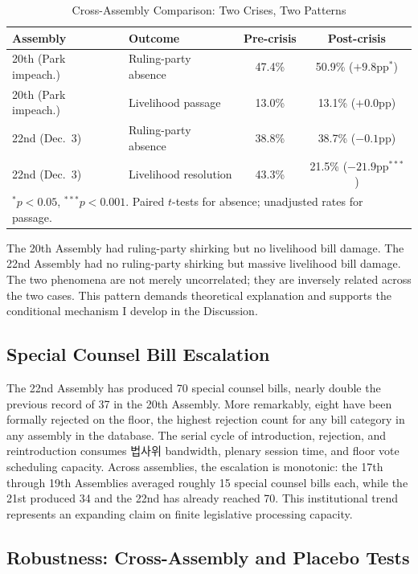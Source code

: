 \documentclass[11pt]{article}
\begin{document}
\begin{table}[htbp]
\centering
\caption{Cross-Assembly Comparison: Two Crises, Two Patterns}
\label{tab:cross}
\begin{tabular}{llcc}
\toprule
Assembly & Outcome & Pre-crisis & Post-crisis \\
\midrule
20th (Park impeach.) & Ruling-party absence & 47.4\% & 50.9\% ($+9.8$pp$^{*}$) \\
20th (Park impeach.) & Livelihood passage & 13.0\% & 13.1\% ($+0.0$pp) \\
\midrule
22nd (Dec.\ 3) & Ruling-party absence & 38.8\% & 38.7\% ($-0.1$pp) \\
22nd (Dec.\ 3) & Livelihood resolution & 43.3\% & 21.5\% ($-21.9$pp$^{***}$) \\
\bottomrule
\multicolumn{4}{l}{\footnotesize $^{*}p<0.05$, $^{***}p<0.001$. Paired $t$-tests for absence; unadjusted rates for passage.}
\end{tabular}
\end{table}

The 20th Assembly had ruling-party shirking but no livelihood bill damage. The 22nd Assembly had no ruling-party shirking but massive livelihood bill damage. The two phenomena are not merely uncorrelated; they are inversely related across the two cases. This pattern demands theoretical explanation and supports the conditional mechanism I develop in the Discussion.

\subsection{Special Counsel Bill Escalation}

The 22nd Assembly has produced 70 special counsel bills, nearly double the previous record of 37 in the 20th Assembly. More remarkably, eight have been formally rejected on the floor, the highest rejection count for any bill category in any assembly in the database. The serial cycle of introduction, rejection, and reintroduction consumes 법사위 bandwidth, plenary session time, and floor vote scheduling capacity. Across assemblies, the escalation is monotonic: the 17th through 19th Assemblies averaged roughly 15 special counsel bills each, while the 21st produced 34 and the 22nd has already reached 70. This institutional trend represents an expanding claim on finite legislative processing capacity.

\subsection{Robustness: Cross-Assembly and Placebo Tests}
\end{document}
